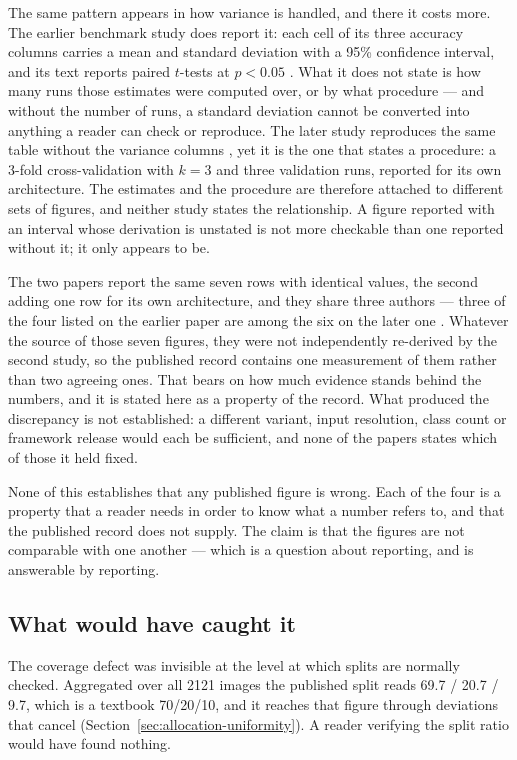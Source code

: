 The same pattern appears in how variance is handled, and there it costs more.
The earlier benchmark study does report it: each cell of its three accuracy
columns carries a mean and standard deviation with a 95\% confidence interval,
and its text reports paired $t$-tests at $p < 0.05$ \citep{yolov12paper}. What it
does not state is how many runs those estimates were computed over, or by what
procedure --- and without the number of runs, a standard deviation cannot be
converted into anything a reader can check or reproduce. The later study
reproduces the same table without the variance columns \citep{yolov13paper}, yet
it is the one that states a procedure: a 3-fold cross-validation with $k = 3$ and
three validation runs, reported for its own architecture. The estimates and the procedure are therefore attached to
different sets of figures, and neither study states the relationship. A
figure reported with an interval whose derivation is unstated is not more
checkable than one reported without it; it only appears to be.

The two papers report the same seven rows with identical values, the second
adding one row for its own architecture, and they share three authors --- three
of the four listed on the earlier paper are among the six on the later one
\citep{yolov12paper,yolov13paper}. Whatever the source of those seven figures,
they were not independently re-derived by the second study, so the published
record contains one measurement of them rather than two agreeing ones. That bears on how much evidence stands behind the numbers, and it is
stated here as a property of the record. What produced the discrepancy is not
established: a different variant, input resolution, class count or framework
release would each be sufficient, and none of the papers states which of those
it held fixed.

None of this establishes that any published figure is wrong. Each of the four is
a property that a reader needs in order to know what a number refers to, and
that the published record does not supply. The claim is that the figures are not
comparable with one another --- which is a question about reporting, and is
answerable by reporting.

\subsection{What would have caught it}
\label{sec:what-would-have-caught-it}

The coverage defect was invisible at the level at which splits are normally
checked. Aggregated over all 2121 images the published split reads 69.7 / 20.7 /
9.7, which is a textbook 70/20/10, and it reaches that figure through deviations
that cancel (Section~\ref{sec:allocation-uniformity}). A reader verifying the
split ratio would have found nothing.

